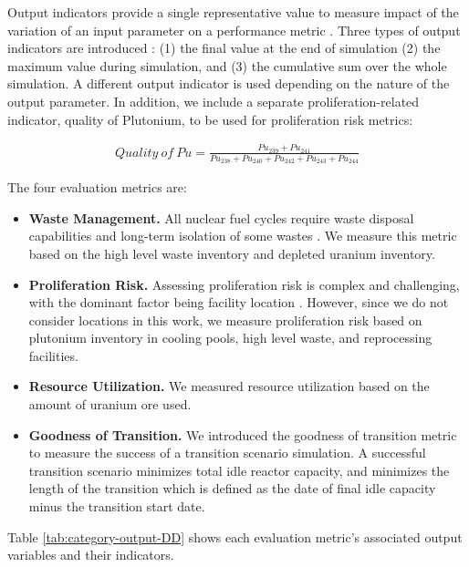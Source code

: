 Output indicators provide a single representative value to measure 
impact of the variation of an input parameter on a performance 
metric \cite{noauthor_effects_2017}. 
Three types of output indicators are introduced 
\cite{noauthor_effects_2017}: 
(1) the final value at the end of simulation
(2) the maximum value during simulation, and 
(3) the cumulative sum over the whole simulation.
A different output indicator is used depending on 
the nature of the output parameter.
In addition, we include a separate proliferation-related indicator, 
quality of Plutonium, to be used for proliferation risk metrics: 

\begin{align}
    \label{eq:pu}
Quality\ of\ Pu = \frac{Pu_{239}+Pu_{241}}{Pu_{238}+Pu_{240}+Pu_{242}+Pu_{243}+Pu_{244}}
\end{align}

The four evaluation metrics are: 
\begin{itemize}
    \item \textbf{Waste Management.} All nuclear fuel cycles
    require waste disposal capabilities and long-term isolation 
    of some wastes \cite{wigeland_nuclear_2014}. We measure this 
    metric based on the high level waste inventory and depleted 
    uranium inventory. 
    \item \textbf{Proliferation Risk.} Assessing proliferation risk
    is complex and challenging, with the dominant factor being facility 
    location \cite{wigeland_nuclear_2014}. 
    However, since we do not consider locations in this work, 
    we measure proliferation risk based on plutonium inventory in 
    cooling pools, high level waste, and reprocessing facilities.  
    \item \textbf{Resource Utilization.}
    We measured resource utilization based on the amount of uranium
    ore used. 
    \item \textbf{Goodness of Transition.} We introduced the goodness 
    of transition metric to measure the success of a transition scenario 
    simulation. A successful transition scenario minimizes total idle reactor
    capacity, and minimizes the length of the transition which is defined
    as the date of final idle capacity minus the transition start date. 
\end{itemize}

Table \ref{tab:category-output-DD} shows each evaluation metric's
associated output variables and their indicators. 

